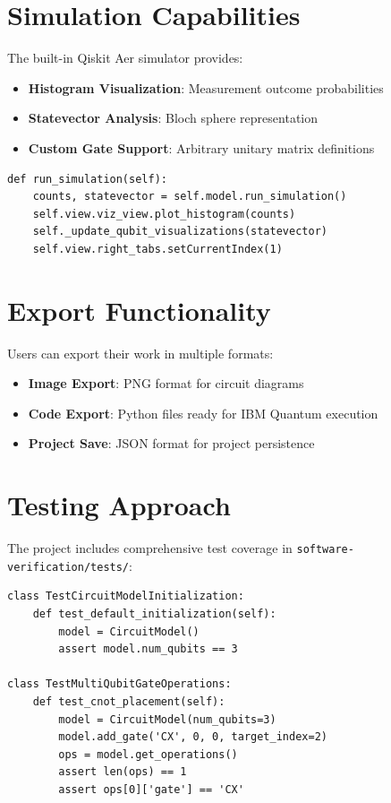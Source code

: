\documentclass[12pt, a4paper, oneside]{report}
\theoremstyle{plain}
\theoremstyle{definition}
\theoremstyle{remark}
\begin{document}
\section{Simulation Capabilities}
The built-in Qiskit Aer simulator provides:

\begin{itemize}
	\item \textbf{Histogram Visualization}: Measurement outcome probabilities
	\item \textbf{Statevector Analysis}: Bloch sphere representation
	\item \textbf{Custom Gate Support}: Arbitrary unitary matrix definitions
\end{itemize}

\begin{listing}[ht]
\begin{verbatim}
def run_simulation(self):
    counts, statevector = self.model.run_simulation()
    self.view.viz_view.plot_histogram(counts)
    self._update_qubit_visualizations(statevector)
    self.view.right_tabs.setCurrentIndex(1)
\end{verbatim}
\caption{Simulation Execution}
\end{listing}

\section{Export Functionality}
Users can export their work in multiple formats:
\begin{itemize}
	\item \textbf{Image Export}: PNG format for circuit diagrams
	\item \textbf{Code Export}: Python files ready for IBM Quantum execution
	\item \textbf{Project Save}: JSON format for project persistence
\end{itemize}

\section{Testing Approach}

The project includes comprehensive test coverage in \texttt{software-verification/tests/}:

\begin{listing}[ht]
\begin{verbatim}
class TestCircuitModelInitialization:
    def test_default_initialization(self):
        model = CircuitModel()
        assert model.num_qubits == 3

class TestMultiQubitGateOperations:
    def test_cnot_placement(self):
        model = CircuitModel(num_qubits=3)
        model.add_gate('CX', 0, 0, target_index=2)
        ops = model.get_operations()
        assert len(ops) == 1
        assert ops[0]['gate'] == 'CX'
\end{verbatim}
\caption{Test Example}
\end{listing}
\end{document}
